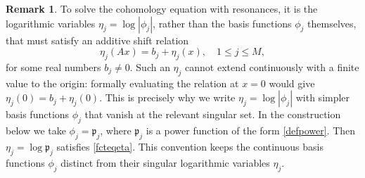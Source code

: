 \documentclass{amsart}
\theoremstyle{plain}
\theoremstyle{definition}
\newtheorem{remark}[theorem]{Remark}
\begin{document}

\begin{remark}
To solve the cohomology equation with resonances, it is the logarithmic variables $\eta_j=\log|\phi_j|$, rather than the basis functions $\phi_j$ themselves, that must satisfy an additive shift relation
\begin{equation}\label{fcteqeta}
    \eta_j(Ax)=b_j+\eta_j(x),\quad 1\leq j\leq M,
\end{equation}
for some real numbers $b_j\neq0$. Such an $\eta_j$ cannot extend continuously with a finite value to the origin: formally evaluating the relation at $x=0$ would give $\eta_j(0)=b_j+\eta_j(0)$. This is precisely why we write $\eta_j=\log|\phi_j|$ with simpler basis functions $\phi_j$ that vanish at the relevant singular set. In the construction below we take $\phi_j=\mathfrak p_j$, where $\mathfrak p_j$ is a power function of the form \eqref{defpower}. Then $\eta_j=\log\mathfrak p_j$ satisfies \eqref{fcteqeta}. This convention keeps the continuous basis functions $\phi_j$ distinct from their singular logarithmic variables $\eta_j$.

\end{remark}












\end{document}
